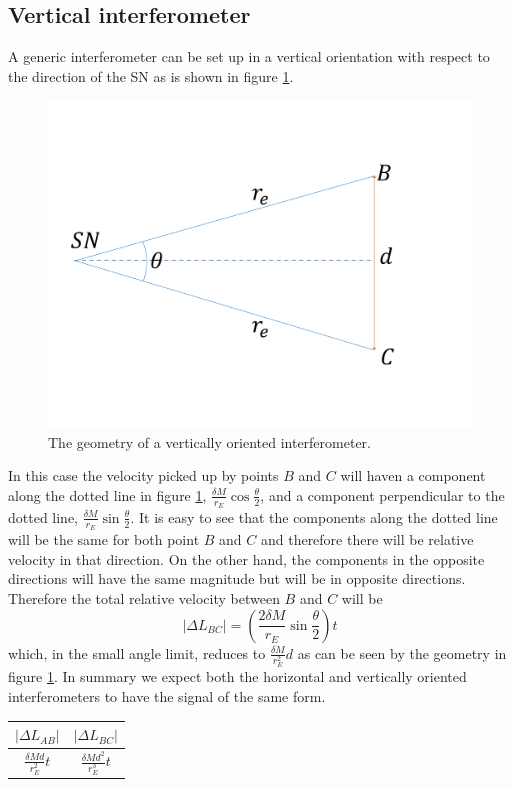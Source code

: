 \documentclass[aps,showpacs,twocolumn,floats,prd,superscriptaddress,nofootinbib]{revtex4-1}
\begin{document}
\subsection{Vertical interferometer}

A generic interferometer can be set up in a vertical orientation with respect to the direction of the SN as is shown in figure \ref{fig:2'}. 

 \begin{figure}[h!]
\begin{center}
\includegraphics[scale = 0.4]{vert.pdf}
\caption{The geometry of a vertically oriented interferometer.}
\label{fig:2'}
\end{center}
\end{figure}

In this case the velocity picked up by points $B$ and $C$ will haven a component along the dotted line in figure \ref{fig:2'}, $\frac{\delta M}{r_E} \cos \frac{\theta}{2}$, and a component perpendicular to the dotted line, $\frac{\delta M}{r_E} \sin \frac{\theta}{2}$. It is easy to see that the components along the dotted line will be the same for both point $B$ and $C$ and therefore there will be relative velocity in that direction. On the other hand, the components in the opposite directions will have the same magnitude but will be in opposite directions. Therefore the total relative velocity between $B$ and $C$ will be
\begin{equation}
	|\Delta L_{BC}| = \left( \frac{2 \delta M}{r_E} \sin \frac{ \theta}{2} \right) t 	
\end{equation}
which, in the small angle limit, reduces to $\frac{\delta M}{r_E^2} d$ as can be seen by the geometry in figure \ref{fig:2'}. 
In summary we expect both the horizontal and vertically oriented interferometers to have the signal of the same form.
\begin{center}
\begin{tabular}{| c | c |} 
\hline
$|\Delta L_{AB}|$ &  $ | \Delta L_{BC} |$  \\   \hline 
$\frac{\delta M d}{r_E^2} t$ & $ \frac{\delta M d^2}{r_E^3} t$  \\ 
\hline 
\end{tabular}
\end{center}
\end{document}

